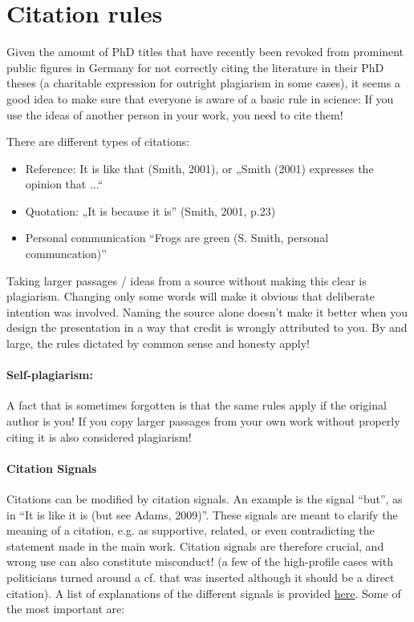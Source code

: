 \documentclass{tufte-book}
\begin{document}
\section{Citation rules}

Given the amount of PhD titles that have recently been revoked from prominent public figures in Germany for not correctly citing the literature in their PhD theses (a charitable expression for outright plagiarism in some cases), it seems a good idea to make sure that everyone is aware of a basic rule in science: If you use the ideas of another person in your work, you need to cite them!

There are different types of citations:

\begin{itemize}
\item Reference: It is like that (Smith, 2001), or „Smith (2001) expresses the opinion that ...“
\item Quotation: „It is because it is” (Smith, 2001, p.23)
\item Personal communication “Frogs are green (S. Smith, personal communcation)”
\end{itemize}

Taking larger passages / ideas from a source without making this clear is plagiarism. Changing only some words will make it obvious that deliberate intention was involved. Naming the source alone doesn’t make it better when you design the presentation in a way that credit is wrongly attributed to you. By and large, the rules dictated by common sense and honesty apply!

\paragraph{Self-plagiarism:} A fact that is sometimes forgotten is that the same rules apply if the original author is you! If you copy larger passages from your own work without properly citing it is also considered plagiarism!

\paragraph{Citation Signals} Citations can be modified by citation signals. An example is the signal ``but'', as in ``It is like it is (but see Adams, 2009)”. These signals are meant to clarify the meaning of a citation, e.g. as supportive, related, or even contradicting the statement made in the main work. Citation signals are therefore crucial, and wrong use can also constitute misconduct! (a few of the high-profile cases with politicians turned around a cf. that was inserted although it should be a direct citation). A list of explanations of the different signals is provided \href{http://en.wikipedia.org/wiki/Citation_signal}{here}. Some of the most important are:
\end{document}
